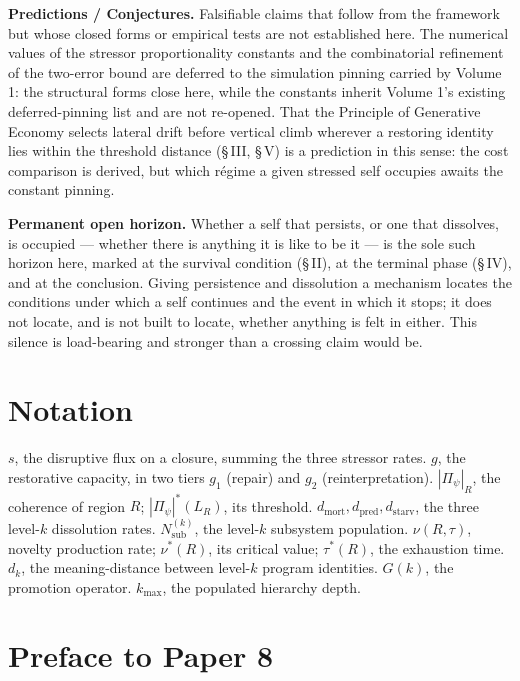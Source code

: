 \documentclass[11pt,oneside]{report}
\theoremstyle{definition}
\theoremstyle{remark}
\begin{document}
\textbf{Predictions / Conjectures.} Falsifiable claims that follow from the framework but whose closed forms or empirical tests are not established here. The numerical values of the stressor proportionality constants and the combinatorial refinement of the two-error bound are deferred to the simulation pinning carried by Volume 1: the structural forms close here, while the constants inherit Volume 1's existing deferred-pinning list and are not re-opened. That the Principle of Generative Economy selects lateral drift before vertical climb wherever a restoring identity lies within the threshold distance (\S\,III, \S\,V) is a prediction in this sense: the cost comparison is derived, but which r\'egime a given stressed self occupies awaits the constant pinning.

\textbf{Permanent open horizon.} Whether a self that persists, or one that dissolves, is occupied --- whether there is anything it is like to be it --- is the sole such horizon here, marked at the survival condition (\S\,II), at the terminal phase (\S\,IV), and at the conclusion. Giving persistence and dissolution a mechanism locates the conditions under which a self continues and the event in which it stops; it does not locate, and is not built to locate, whether anything is felt in either. This silence is load-bearing and stronger than a crossing claim would be.

\section*{Notation}

\ensuremath{s}, the disruptive flux on a closure, summing the three stressor rates. \ensuremath{g}, the restorative capacity, in two tiers \ensuremath{g_1} (repair) and \ensuremath{g_2} (reinterpretation). \ensuremath{|\Pi_\psi|_R}, the coherence of region \ensuremath{R}; \ensuremath{|\Pi_\psi|^*(L_R)}, its threshold. \ensuremath{d_{\mathrm{mort}}, d_{\mathrm{pred}}, d_{\mathrm{starv}}}, the three level-\ensuremath{k} dissolution rates. \ensuremath{N_{\mathrm{sub}}^{(k)}}, the level-\ensuremath{k} subsystem population. \ensuremath{\nu(R,\tau)}, novelty production rate; \ensuremath{\nu^*(R)}, its critical value; \ensuremath{\tau^*(R)}, the exhaustion time. \ensuremath{d_k}, the meaning-distance between level-\ensuremath{k} program identities. \ensuremath{G(k)}, the promotion operator. \ensuremath{k_{\max}}, the populated hierarchy depth.

\section*{Preface to Paper 8}
\end{document}
